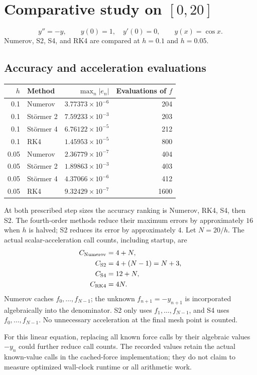 \documentclass[11pt,a4paper]{article}
\begin{document}
\section{Comparative study on \texorpdfstring{$[0,20]$}{[0,20]}}
\[
y''=-y,\qquad y(0)=1,\quad y'(0)=0,\qquad y(x)=\cos x.
\]
Numerov, S2, S4, and RK4 are compared at $h=0.1$ and $h=0.05$.
\subsection{Accuracy and acceleration evaluations}

\begin{center}\small
\begin{tabular}{rlrr}
\toprule $h$ & Method & $\max_n|e_n|$ & Evaluations of $f$ \\ \midrule
0.1 & Numerov & $3.77373\times 10^{-6}$ & 204 \\
0.1 & St\"ormer 2 & $7.59233\times 10^{-3}$ & 203 \\
0.1 & St\"ormer 4 & $6.76122\times 10^{-5}$ & 212 \\
0.1 & RK4 & $1.45953\times 10^{-5}$ & 800 \\
0.05 & Numerov & $2.36779\times 10^{-7}$ & 404 \\
0.05 & St\"ormer 2 & $1.89863\times 10^{-3}$ & 403 \\
0.05 & St\"ormer 4 & $4.37066\times 10^{-6}$ & 412 \\
0.05 & RK4 & $9.32429\times 10^{-7}$ & 1600 \\
\bottomrule
\end{tabular}
\end{center}
At both prescribed step sizes the accuracy ranking is Numerov, RK4, S4, then S2. The fourth-order methods reduce their maximum errors by approximately $16$ when $h$ is halved; S2 reduces its error by approximately $4$.
Let $N=20/h$. The actual scalar-acceleration call counts, including startup, are
\begin{align*}
C_{\rm Numerov}&=4+N,\\
C_{\rm S2}&=4+(N-1)=N+3,\\
C_{\rm S4}&=12+N,\\
C_{\rm RK4}&=4N.
\end{align*}
Numerov caches $f_0,\ldots,f_{N-1}$; the unknown $f_{n+1}=-y_{n+1}$
is incorporated algebraically into the denominator. S2 only uses
$f_1,\ldots,f_{N-1}$, and S4 uses $f_0,\ldots,f_{N-1}$.
No unnecessary acceleration at the final mesh point is counted.

For this linear equation, replacing all known force calls by their algebraic
values $-y_n$ could further reduce call counts. The recorded values retain
the actual known-value calls in the cached-force implementation; they do
not claim to measure optimized wall-clock runtime or all arithmetic work.
\end{document}

